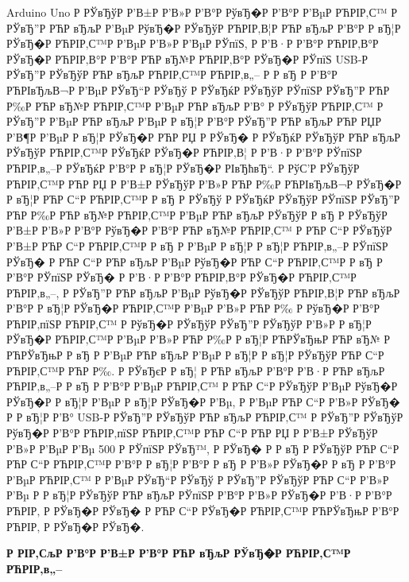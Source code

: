 \documentclass[a4paper,14pt]{extarticle}
\begin{document}
Arduino Uno Р  РЎвЂўР  Р’В±Р  Р’В»Р  Р’В°Р  РўвЂ�Р  Р’В°Р  Р’ВµР РЋРІР‚С™ Р  РЎвЂ”Р РЋР вЂљР  Р’ВµР  РўвЂ�Р  РЎвЂўР РЋРІР‚В¦Р РЋР вЂљР  Р’В°Р  Р вЂ¦Р  РЎвЂ�Р РЋРІР‚С™Р  Р’ВµР  Р’В»Р  Р’ВµР  РЎпїЅ, Р  Р’В·Р  Р’В°Р РЋРІР‚В°Р  РЎвЂ�Р РЋРІР‚В°Р  Р’В°Р РЋР вЂ№Р РЋРІР‚В°Р  РЎвЂ�Р  РЎпїЅ USB-Р  РЎвЂ”Р  РЎвЂўР РЋР вЂљР РЋРІР‚С™Р РЋРІР‚в„– Р  Р вЂ Р  Р’В°Р РЋРІвЂљВ¬Р  Р’ВµР  РЎвЂ“Р  РЎвЂў Р  РЎвЂќР  РЎвЂўР  РЎпїЅР  РЎвЂ”Р РЋР Р‰Р РЋР вЂ№Р РЋРІР‚С™Р  Р’ВµР РЋР вЂљР  Р’В° Р  РЎвЂўР РЋРІР‚С™ Р  РЎвЂ”Р  Р’ВµР РЋР вЂљР  Р’ВµР  Р вЂ¦Р  Р’В°Р  РЎвЂ”Р РЋР вЂљР РЋР РЏР  Р’В¶Р  Р’ВµР  Р вЂ¦Р  РЎвЂ�Р РЋР РЏ Р  РЎвЂ� Р  РЎвЂќР  РЎвЂўР РЋР вЂљР  РЎвЂўР РЋРІР‚С™Р  РЎвЂќР  РЎвЂ�Р РЋРІР‚В¦ Р  Р’В·Р  Р’В°Р  РЎпїЅР РЋРІР‚в„–Р  РЎвЂќР  Р’В°Р  Р вЂ¦Р  РЎвЂ�Р  РІвЂћвЂ“. Р  РўС’Р  РЎвЂўР РЋРІР‚С™Р РЋР РЏ Р  Р’В±Р  РЎвЂўР  Р’В»Р РЋР Р‰Р РЋРІвЂљВ¬Р  РЎвЂ�Р  Р вЂ¦Р РЋР С“Р РЋРІР‚С™Р  Р вЂ Р  РЎвЂў Р  РЎвЂќР  РЎвЂўР  РЎпїЅР  РЎвЂ”Р РЋР Р‰Р РЋР вЂ№Р РЋРІР‚С™Р  Р’ВµР РЋР вЂљР  РЎвЂўР  Р вЂ  Р  РЎвЂўР  Р’В±Р  Р’В»Р  Р’В°Р  РўвЂ�Р  Р’В°Р РЋР вЂ№Р РЋРІР‚С™ Р РЋР С“Р  РЎвЂўР  Р’В±Р РЋР С“Р РЋРІР‚С™Р  Р вЂ Р  Р’ВµР  Р вЂ¦Р  Р вЂ¦Р РЋРІР‚в„–Р  РЎпїЅР  РЎвЂ� Р РЋР С“Р РЋР вЂљР  Р’ВµР  РўвЂ�Р РЋР С“Р РЋРІР‚С™Р  Р вЂ Р  Р’В°Р  РЎпїЅР  РЎвЂ� Р  Р’В·Р  Р’В°Р РЋРІР‚В°Р  РЎвЂ�Р РЋРІР‚С™Р РЋРІР‚в„–, Р  РЎвЂ”Р РЋР вЂљР  Р’ВµР  РўвЂ�Р  РЎвЂўР РЋРІР‚В¦Р РЋР вЂљР  Р’В°Р  Р вЂ¦Р  РЎвЂ�Р РЋРІР‚С™Р  Р’ВµР  Р’В»Р РЋР Р‰ Р  РўвЂ�Р  Р’В°Р РЋРІР‚пїЅР РЋРІР‚С™ Р  РўвЂ�Р  РЎвЂўР  РЎвЂ”Р  РЎвЂўР  Р’В»Р  Р вЂ¦Р  РЎвЂ�Р РЋРІР‚С™Р  Р’ВµР  Р’В»Р РЋР Р‰Р  Р вЂ¦Р РЋРЎвЂњР РЋР вЂ№ Р РЋРЎвЂњР  Р вЂ Р  Р’ВµР РЋР вЂљР  Р’ВµР  Р вЂ¦Р  Р вЂ¦Р  РЎвЂўР РЋР С“Р РЋРІР‚С™Р РЋР Р‰. Р  РЎвЂєР  Р вЂ¦ Р РЋР вЂљР  Р’В°Р  Р’В·Р РЋР вЂљР РЋРІР‚в„–Р  Р вЂ Р  Р’В°Р  Р’ВµР РЋРІР‚С™ Р РЋР С“Р  РЎвЂўР  Р’ВµР  РўвЂ�Р  РЎвЂ�Р  Р вЂ¦Р  Р’ВµР  Р вЂ¦Р  РЎвЂ�Р  Р’Вµ, Р  Р’ВµР РЋР С“Р  Р’В»Р  РЎвЂ� Р  Р вЂ¦Р  Р’В° USB-Р  РЎвЂ”Р  РЎвЂўР РЋР вЂљР РЋРІР‚С™ Р  РЎвЂ”Р  РЎвЂўР  РўвЂ�Р  Р’В°Р РЋРІР‚пїЅР РЋРІР‚С™Р РЋР С“Р РЋР РЏ Р  Р’В±Р  РЎвЂўР  Р’В»Р  Р’ВµР  Р’Вµ 500 Р  РЎпїЅР  РЎвЂ™, Р  РЎвЂ� Р  Р вЂ Р  РЎвЂўР РЋР С“Р РЋР С“Р РЋРІР‚С™Р  Р’В°Р  Р вЂ¦Р  Р’В°Р  Р вЂ Р  Р’В»Р  РЎвЂ�Р  Р вЂ Р  Р’В°Р  Р’ВµР РЋРІР‚С™ Р  Р’ВµР  РЎвЂ“Р  РЎвЂў Р  РЎвЂ”Р  РЎвЂўР РЋР С“Р  Р’В»Р  Р’Вµ Р  Р вЂ¦Р  РЎвЂўР РЋР вЂљР  РЎпїЅР  Р’В°Р  Р’В»Р  РЎвЂ�Р  Р’В·Р  Р’В°Р РЋРІР‚ Р  РЎвЂ�Р  РЎвЂ� Р РЋР С“Р  РЎвЂ�Р РЋРІР‚С™Р РЋРЎвЂњР  Р’В°Р РЋРІР‚ Р  РЎвЂ�Р  РЎвЂ�.
\centerline{\large \bfseries Р  РІР‚СљР  Р’В°Р  Р’В±Р  Р’В°Р РЋР вЂљР  РЎвЂ�Р РЋРІР‚С™Р РЋРІР‚в„–}
\end{document}
